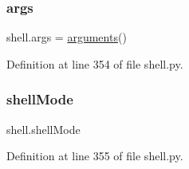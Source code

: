 \subsubsection{\texorpdfstring{args}{args}}
{\footnotesize\ttfamily shell.\+args = \hyperlink{classarguments_1_1arguments}{arguments}()}



Definition at line 354 of file shell.\+py.

\mbox{\label{namespaceshell_a01f54959c7299ff506841249f48b2d47}} 
\subsubsection{\texorpdfstring{shell\+Mode}{shellMode}}
{\footnotesize\ttfamily shell.\+shell\+Mode}



Definition at line 355 of file shell.\+py.

